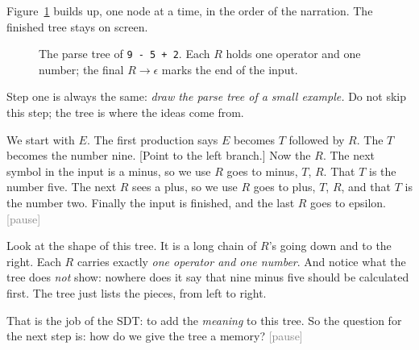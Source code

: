 \documentclass[11pt,a4paper]{article}
\newcommand{\pause}{\textcolor{gray}{\textsf{[pause]}}}
\begin{document}
\begin{onscreen}
Figure~\ref{fig:v-parse} builds up, one node at a time, in the order of the narration. The finished tree stays on screen.
\begin{figure}[H]
\centering
{}
\caption{The parse tree of \texttt{9 - 5 + 2}. Each $R$ holds one operator and one number; the final $R\to\epsilon$ marks the end of the input.}
\label{fig:v-parse}
\end{figure}
\end{onscreen}

\begin{narration}
Step one is always the same: \emph{draw the parse tree of a small example.} Do not skip this step; the tree is where the ideas come from.

We start with $E$. The first production says $E$ becomes $T$ followed by $R$. The $T$ becomes the number nine. [Point to the left branch.] Now the $R$. The next symbol in the input is a minus, so we use $R$ goes to minus, $T$, $R$. That $T$ is the number five. The next $R$ sees a plus, so we use $R$ goes to plus, $T$, $R$, and that $T$ is the number two. Finally the input is finished, and the last $R$ goes to epsilon. \pause

Look at the shape of this tree. It is a long chain of $R$'s going down and to the right. Each $R$ carries exactly \emph{one operator and one number}. And notice what the tree does \emph{not} show: nowhere does it say that nine minus five should be calculated first. The tree just lists the pieces, from left to right.

That is the job of the SDT: to add the \emph{meaning} to this tree. So the question for the next step is: how do we give the tree a memory? \pause
\end{narration}
\end{document}
